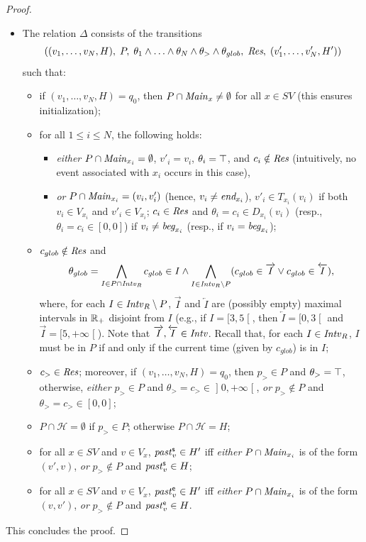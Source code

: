 \begin{proof}
\begin{itemize}
\item   
The relation $\Delta$ consists of the transitions 
\[((v_1,\ldots,v_N,H),\; P,\; \theta_1\wedge \ldots \wedge \theta_N \wedge \theta_> \wedge \theta_{glob},\; \textit{Res},\; (v'_1,\ldots,v'_N,H'))\]
such that:
\begin{itemize}
   \item if $(v_1,\ldots,v_N,H)=q_0$, then $P\cap {\mathit{Main}}_{x}\neq \emptyset$ for all $x\in SV$ (this ensures initialization);
     \item for all $1\leq i\leq N$, the following holds:
     \begin{itemize}
       \item \emph{either}  $P\cap {\mathit{Main}}_{x_i}=\emptyset$, $v'_i=v_i$, $\theta_i=\operatorname{\top}$, and $c_i\notin \textit{Res}$ (intuitively, no event associated with $x_i$ occurs in this case),
       \item \emph{or}   $P\cap {\mathit{Main}}_{x_i}=(v_i,v'_i)$ (hence, $v_i\neq \textit{end}_{x_i}$),
       $v'_i\in T_{x_i}(v_i)$ if both $v_i\in V_{x_i}$ and $v'_i\in V_{x_i}$; $c_i\in \textit{Res}$ and $\theta_i= c_i\in D_{x_i}(v_i)$
            (resp., $\theta_i= c_i\in [0,0]$) if $v_i\neq \textit{beg}_{x_i}$ (resp., if $v_i=\textit{beg}_{x_i}$);
     \end{itemize}
      \item $c_{glob}\notin \textit{Res}$ and \[\theta_{glob}= \bigwedge_{I\in P\cap {\mathit{Intv}}_R } c_{glob}\in I \wedge \bigwedge_{I\in {\mathit{Intv}}_R\setminus P } (c_{glob}\in \overrightarrow{I} \vee c_{glob}\in \overleftarrow{I}),\] where, for each $I\in {\mathit{Intv}}_R\setminus P$, $\overrightarrow{I}$ and $\overleftarrow{I}$ are (possibly empty) maximal intervals in ${\mathbb{R}_+}$ disjoint from $I$ (e.g., if $I=\mathopen[3,5\mathclose[$, then $\overleftarrow{I}=\mathopen[0,3\mathclose[$ and  $\overrightarrow{I}=\mathopen[5,+\infty\mathclose[$). Note that $\overrightarrow{I}, \overleftarrow{I}\in {\mathit{Intv}}$. Recall that, 
      for each $I\in {\mathit{Intv}}_R$, $I$ must be in $P$ if and only if the current time (given by $c_{glob}$) is in $I$;
     \item $c_>\in \textit{Res}$; moreover, if $(v_1,\ldots,v_N,H)=q_0$, then  $p_>\in P$   and $\theta_> = \operatorname{\top}$, otherwise, \emph{either} $p_>\in P$ and $\theta_>=c_>\in \mathopen]0,+\infty\mathclose[$, \emph{or} $p_>\notin P$ and $\theta_>=c_>\in [0,0]$;
     \item $P\cap \mathcal{H}=\emptyset$ if $p_>\in P$; otherwise $P\cap \mathcal{H}=H$;
     \item for all $x\in SV$ and $v\in V_{x}$, ${\mathit{past}}^{\mathsf{s}}_v\in H'$ iff \emph{either} $P\cap {\mathit{Main}}_{x_i}$ is of the form $(v',v)$, \emph{or}
     $p_>\notin P$ and ${\mathit{past}}^{\mathsf{s}}_v\in H$;
     \item for all $x\in SV$ and $v\in V_{x}$, ${\mathit{past}}^{\mathsf{e}}_v\in H'$ iff \emph{either} $P\cap {\mathit{Main}}_{x_i}$ is of the form $(v,v')$, \emph{or}
     $p_>\notin P$ and ${\mathit{past}}^{\mathsf{e}}_v\in H$.
\end{itemize}
\end{itemize}
 This concludes the proof. %
 \end{proof}


